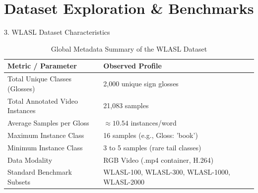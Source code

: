\documentclass[aspectratio=169, 10pt]{beamer}
\begin{document}
\section{Dataset Exploration \& Benchmarks}

\begin{frame}{3. WLASL Dataset Characteristics}
  \begin{table}
    \centering
    \caption{Global Metadata Summary of the WLASL Dataset}
    \small
    \begin{tabular}{ll}
      \toprule
      \textbf{Metric / Parameter} & \textbf{Observed Profile} \\
      \midrule
      Total Unique Classes (Glosses) & 2,000 unique sign glosses \\
      Total Annotated Video Instances & 21,083 samples \\
      Average Samples per Gloss & $\approx 10.54$ instances/word \\
      Maximum Instance Class & 16 samples (e.g., Gloss: 'book') \\
      Minimum Instance Class & 3 to 5 samples (rare tail classes) \\
      Data Modality & RGB Video (.mp4 container, H.264) \\
      Standard Benchmark Subsets & WLASL-100, WLASL-300, WLASL-1000, WLASL-2000 \\
      \bottomrule
    \end{tabular}
  \end{table}
\end{frame}
\end{document}

